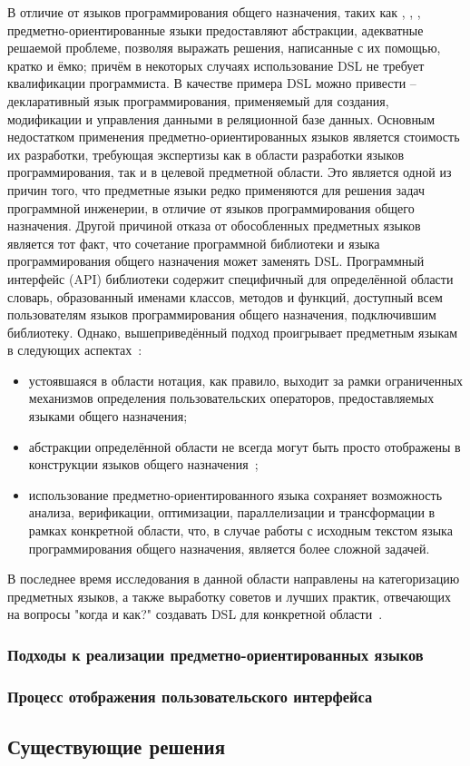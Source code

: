В отличие от языков программирования общего назначения, таких как ,
, , предметно-ориентированные языки предоставляют
абстракции, адекватные решаемой проблеме, позволяя выражать решения,
написанные с их помощью, кратко и ёмко; причём в некоторых случаях
использование DSL не требует квалификации программиста.
В качестве примера DSL можно привести  --  декларативный язык
программирования, применяемый для создания, модификации и управления данными в
реляционной базе данных.
Основным недостатком применения предметно-ориентированных языков является
стоимость их разработки, требующая экспертизы как в области разработки языков
программирования, так и в целевой предметной области.
Это является одной из причин того, что предметные языки редко применяются
для решения задач программной инженерии, в отличие от языков программирования
общего назначения.
Другой причиной отказа от обособленных предметных языков является тот факт,
что сочетание программной библиотеки и языка программирования общего
назначения может заменять DSL.
Программный интерфейс (API) библиотеки содержит специфичный для определённой
области словарь, образованный именами классов, методов и функций, доступный
всем пользователям языков программирования общего назначения, подключившим
библиотеку.
Однако, вышеприведённый подход проигрывает предметным языкам в следующих
аспектах~\cite{when-and-how-develop-dsl,dsl-spectrum-wile}:
\begin{itemize}
	\item устоявшаяся в области нотация, как правило, выходит за рамки
	ограниченных механизмов определения пользовательских операторов,
	предоставляемых языками общего назначения;
	\item абстракции определённой области не всегда могут быть
	просто отображены в конструкции языков общего назначения~\cite{dsl-traversal-transform};
	\item использование предметно-ориентированного языка сохраняет
	возможность анализа, верификации, оптимизации, параллелизации и
	трансформации в рамках конкретной области, что, в случае работы с
	исходным текстом языка программирования общего назначения, является
	более сложной задачей.
\end{itemize}

В последнее время исследования в данной области направлены на категоризацию
предметных языков, а также выработку советов и лучших практик, отвечающих на
вопросы "когда и как?" создавать DSL для конкретной области~\cite{when-and-how-develop-dsl,study-on-preliminary-approaches-develop-dsl,spinellis-dsl-patterns}.

\subsubsection{Подходы к реализации предметно-ориентированных языков}

\subsubsection{Процесс отображения пользовательского интерфейса}


\subsection{Существующие решения}
